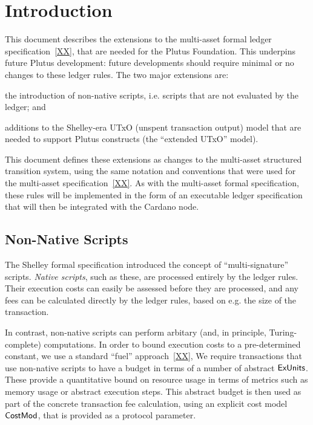 \section{Introduction}

This document describes the extensions to the multi-asset formal ledger specification~\ref{XX},
that are needed for the Plutus Foundation.  This underpins future Plutus development: future developments should require minimal or no changes to these ledger rules.
%
The two major extensions are:
\begin{inparaenum}
\item
the introduction
of non-native scripts, i.e. scripts that are not evaluated by the ledger; and
\item
  additions to the Shelley-era UTxO (unspent transaction output) model that are needed to support Plutus
  constructs (the ``extended UTxO'' model).
\end{inparaenum}
This document defines these extensions as changes to the multi-asset structured transition system,
using the same notation and conventions that were used for the multi-asset specification~\ref{XX}.
As with the multi-asset formal specification, these rules will be implemented in the form of an executable ledger specification that will then be
integrated with the Cardano node.

\subsection{Non-Native Scripts}

The Shelley formal specification introduced the concept of ``multi-signature'' scripts.
\emph{Native scripts}, such as these, are processed entirely by the ledger rules.
Their execution costs can easily be assessed before they are processed,
and any fees can be calculated directly by the ledger rules, based on e.g. the
size of the transaction.

In contrast, non-native scripts can perform arbitary
(and, in principle, Turing-complete) computations.
In order to bound execution costs to a pre-determined constant, we use a standard ``fuel'' approach~\ref{XX},
We require transactions that use non-native scripts
to have a budget in terms of a number of abstract $\mathsf{ExUnits}$.
These provide a quantitative bound on resource usage in terms of metrics such as memory usage or abstract execution steps.
This abstract budget is then used as part of the concrete transaction fee calculation, using an explicit
cost model $\mathsf{CostMod}$, that is provided as a protocol parameter.

